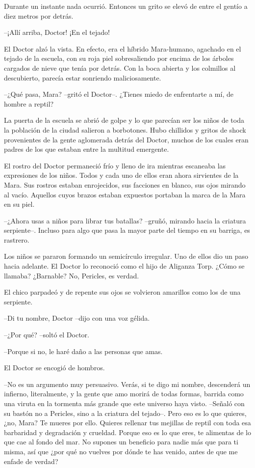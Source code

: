 Durante un instante nada ocurrió. Entonces un grito se elevó de entre el gentío a diez metros por detrás.

--¡Allí arriba, Doctor! ¡En el tejado!

El Doctor alzó la vista. En efecto, era el híbrido Mara-humano, agachado en el tejado de la escuela, con su roja piel sobresaliendo por encima de los árboles cargados de nieve que tenía por detrás. Con la boca abierta y los colmillos al descubierto, parecía estar sonriendo maliciosamente.

--¿Qué pasa, Mara? --gritó el Doctor--. ¿Tienes miedo de enfrentarte a mí, de hombre a reptil?

La puerta de la escuela se abrió de golpe y lo que parecían ser los niños de toda la población de la ciudad salieron a borbotones. Hubo chillidos y gritos de shock provenientes de la gente aglomerada detrás del Doctor, muchos de los cuales eran padres de los que estaban entre la multitud emergente.

El rostro del Doctor permaneció frío y lleno de ira mientras escaneaba las expresiones de los niños. Todos y cada uno de ellos eran ahora sirvientes de la Mara. Sus rostros estaban enrojecidos, sus facciones en blanco, sus ojos mirando al vacío. Aquellos cuyos brazos estaban expuestos portaban la marca de la Mara en su piel.

--¿Ahora usas a niños para librar tus batallas? --gruñó, mirando hacia la criatura serpiente--. Incluso para algo que pasa la mayor parte del tiempo en su barriga, es rastrero.

Los niños se pararon formando un semicírculo irregular. Uno de ellos dio un paso hacia adelante. El Doctor lo reconoció como el hijo de Aliganza Torp. ¿Cómo se llamaba? ¿Barnable? No, Pericles, es verdad.

El chico parpadeó y de repente sus ojos se volvieron amarillos como los de una serpiente.

--Di tu nombre, Doctor --dijo con una voz gélida.

--¿Por qué? --soltó el Doctor.

--Porque si no, le haré daño a las personas que amas.

El Doctor se encogió de hombros.

--No es un argumento muy persuasivo. Verás, si te digo mi nombre, descenderá un infierno, literalmente, y la gente que amo morirá de todas formas, barrida como una viruta en la tormenta más grande que este universo haya visto. --Señaló con su bastón no a Pericles, sino a la criatura del tejado--. Pero eso es lo que quieres, ¿no, Mara? Te mueres por ello. Quieres rellenar tus mejillas de reptil con toda esa barbaridad y degradación y crueldad. Porque eso es lo que eres, te alimentas de lo que cae al fondo del mar. No supones un beneficio para nadie más que para ti misma, así que ¿por qué no vuelves por dónde te has venido, antes de que me enfade de verdad?

